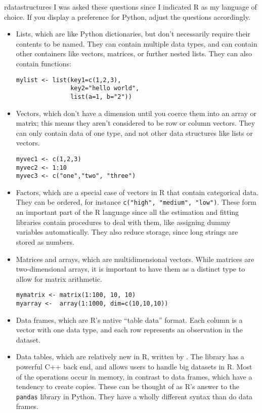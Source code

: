 \begin{answer}{rdatastructures}
I was asked these questions since I indicated R as my language of choice.
If you display a preference for Python, adjust the questions accordingly.
\begin{itemize}
  \item Lists, which are like Python dictionaries, but don't necessarily require their contents to be named.
  They can contain multiple data types, and can contain other containers like vectors, matrices, or further nested lists.
  They can also contain functions:
  \begin{verbatim}
mylist <- list(key1=c(1,2,3),
               key2="hello world",
               list(a=1, b="2"))
  \end{verbatim}
  \item Vectors, which don't have a dimension until you coerce them into an array or matrix;
  this means they aren't considered to be row or column vectors.
  They can only contain data of one type, and not other data structures like lists or vectors.
  \begin{verbatim}
myvec1 <- c(1,2,3)
myvec2 <- 1:10
myvec3 <- c("one","two", "three")
  \end{verbatim}
  \item
  Factors, which are a special case of vectors in R that contain categorical data.
  They can be ordered, for instance \verb+c("high", "medium", "low")+.
  These form an important part of the R language since all the estimation and fitting libraries contain procedures to deal with them, like assigning dummy variables automatically.
  They also reduce storage, since long strings are stored as numbers.
  \item Matrices and arrays,
  which are multidimensional vectors.
  While matrices are two-dimensional arrays, it is important to have them as a distinct type to allow for matrix arithmetic.
  \begin{verbatim}
mymatrix <- matrix(1:100, 10, 10)
myarray <-  array(1:1000, dim=c(10,10,10))
  \end{verbatim}
  \item Data frames, which are R's native ``table data'' format.
  Each column is a vector with one data type, and each row represents an observation in the dataset.
  \item Data tables, which are relatively new in R, written by \citet{datatables}.
  The library has a powerful C++ back end, and allows users to handle big datasets in R.
  Most of the operations occur in memory, in contrast to data frames, which have a tendency to create copies.
  These can be thought of as R's answer to the \verb+pandas+ library in Python.
  They have a wholly different syntax than do data frames.
\end{itemize}
\end{answer}
